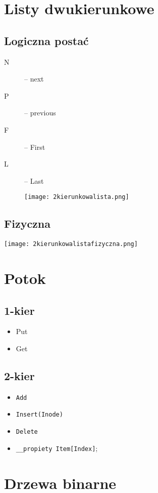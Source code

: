 \documentclass[11pt]{article}
\begin{document}
\section{Listy dwukierunkowe}
\label{sec:org0e18fe6}
\subsection{Logiczna postać}
\label{sec:orge99c45f}
\begin{description}
\item[{N}] -- next
\item[{P}] -- previous
\item[{F}] -- First
\item[{L}] -- Last
\begin{center}
\texttt{[image: 2kierunkowalista.png]}
\end{center}
\end{description}
\subsection{Fizyczna}
\label{sec:org9d2b265}
\begin{center}
\texttt{[image: 2kierunkowalistafizyczna.png]}
\end{center}
\section{Potok}
\label{sec:orgfb9cbc0}
\subsection{1-kier}
\label{sec:org8a2a201}
\begin{itemize}
\item Put
\item Get
\end{itemize}
\subsection{2-kier}
\label{sec:orgf72b046}
\begin{itemize}
\item \texttt{Add}
\item \texttt{Insert(Inode)}
\item \texttt{Delete}
\item \texttt{\_\_propiety Item[Index]};
\end{itemize}
\section{Drzewa binarne}
\label{sec:orgdd43d66}
\end{document}
